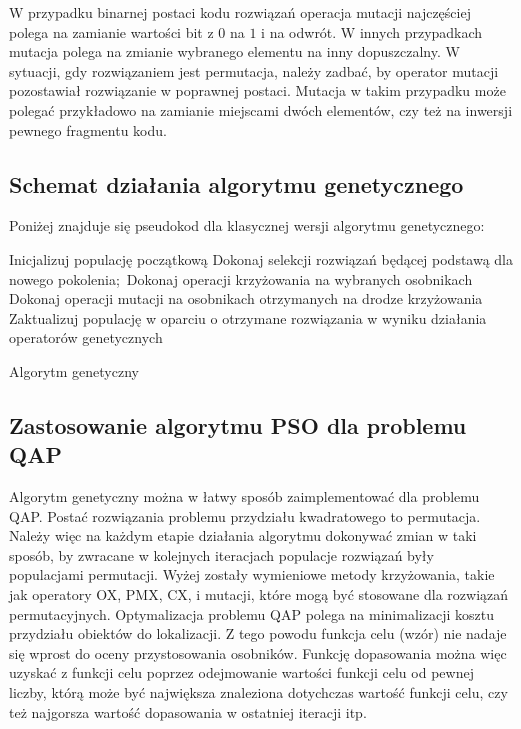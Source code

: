 W przypadku binarnej postaci kodu rozwiązań operacja mutacji najczęściej polega na zamianie wartości bit z $0$ na $1$ i na odwrót. W innych przypadkach mutacja polega na zmianie wybranego elementu na inny dopuszczalny. W sytuacji, gdy rozwiązaniem jest permutacja, należy zadbać, by operator mutacji pozostawiał rozwiązanie w poprawnej postaci. Mutacja w takim przypadku może polegać przykładowo na zamianie miejscami dwóch elementów, czy też na inwersji pewnego fragmentu kodu. 

\subsection{Schemat działania algorytmu genetycznego}
Poniżej znajduje się pseudokod dla klasycznej wersji algorytmu genetycznego:
\begin{algorithm}[H]
	Inicjalizuj populację początkową\;
 	{
 		Dokonaj selekcji rozwiązań będącej podstawą dla nowego pokolenia;\
 		Dokonaj operacji krzyżowania na wybranych osobnikach\;
 		Dokonaj operacji mutacji na osobnikach otrzymanych na drodze krzyżowania\;
 		Zaktualizuj populację w oparciu o otrzymane rozwiązania w wyniku działania operatorów genetycznych
 	}
 	\caption{Algorytm genetyczny}
\end{algorithm}
\subsection{Zastosowanie algorytmu PSO dla problemu QAP}
Algorytm genetyczny można w łatwy sposób zaimplementować dla problemu QAP. Postać rozwiązania problemu przydziału kwadratowego to permutacja. Należy więc na każdym etapie działania algorytmu dokonywać zmian w taki sposób, by zwracane w kolejnych iteracjach populacje rozwiązań były populacjami permutacji. Wyżej zostały wymieniowe metody krzyżowania, takie jak operatory OX, PMX, CX, i mutacji, które mogą być stosowane dla rozwiązań permutacyjnych.
Optymalizacja problemu QAP polega na minimalizacji kosztu przydziału obiektów do lokalizacji. Z tego powodu funkcja celu (wzór) nie nadaje się wprost do oceny przystosowania osobników. Funkcję dopasowania można więc uzyskać z funkcji celu poprzez odejmowanie wartości funkcji celu od pewnej liczby, którą może być największa znaleziona dotychczas wartość funkcji celu, czy też najgorsza wartość dopasowania w ostatniej iteracji itp.